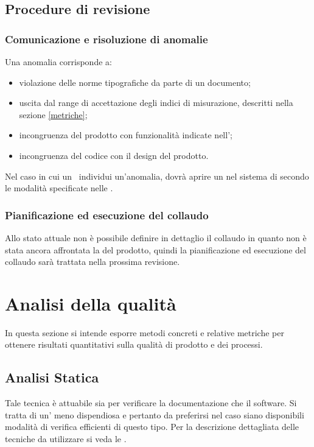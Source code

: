 \documentclass[12pt,a4paper]{article}
\begin{document}
\subsection{Procedure di revisione}
\subsubsection{Comunicazione e risoluzione di anomalie}
Una anomalia corrisponde a:
\begin{itemize}
	\item violazione delle norme tipografiche da parte di un documento;
	\item uscita dal range di accettazione degli indici di misurazione, descritti nella sezione \ref{metriche};
	\item incongruenza del prodotto con funzionalità indicate nell'\AdR;
	\item incongruenza del codice con il design del prodotto.
\end{itemize}
Nel caso in cui un \VR\ individui un'anomalia, dovrà aprire un   nel sistema di  secondo le modalità specificate nelle \NdP.

\subsubsection{Pianificazione ed esecuzione del collaudo}
Allo stato attuale non è possibile definire in dettaglio il collaudo in quanto non è stata ancora affrontata la  del prodotto, quindi la pianificazione ed esecuzione del collaudo sarà trattata nella prossima revisione.

\newpage

\section{Analisi della qualità}\label{analisi}
In questa sezione si intende esporre metodi concreti e relative metriche per ottenere risultati quantitativi sulla qualità di prodotto e dei processi. 

\subsection{Analisi Statica} 
Tale tecnica è attuabile sia per verificare la documentazione che il software. Si tratta di un'  meno dispendiosa e pertanto da preferirsi nel caso siano disponibili modalità di verifica efficienti di questo tipo. Per la descrizione dettagliata delle tecniche da utilizzare si veda le \NdP.
\end{document}
